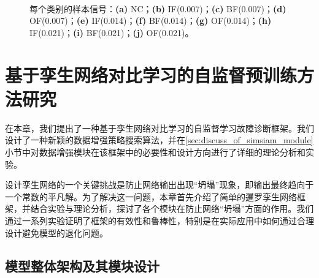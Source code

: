 \documentclass[master]{thesis-uestc}
\begin{document}
\begin{figure}
    \centering
    \\ %
    \\ %
    \\ %

    \caption{每个类别的样本信号：\textbf{(a)} NC；\textbf{(b)} IF(0.007)；\textbf{(c)} BF(0.007)；\textbf{(d)} OF(0.007)；\textbf{(e)} IF(0.014)；\textbf{(f)} BF(0.014)；\textbf{(g)} OF(0.014)；\textbf{(h)} IF(0.021)；\textbf{(i)} BF(0.021)；\textbf{(j)} OF(0.021)。}
    \label{cwru_samples}
\end{figure}



\chapter{基于孪生网络对比学习的自监督预训练方法研究}
在本章，我们提出了一种基于孪生网络对比学习的自监督学习故障诊断框架。我们设计了一种新颖的数据增强策略搜索算法，并在\ref{sec:discuss_of_simsiam_module}小节中对数据增强模块在该框架中的必要性和设计方向进行了详细的理论分析和实验。

设计孪生网络的一个关键挑战是防止网络输出出现“坍塌”现象，即输出最终趋向于一个常数的平凡解。为了解决这一问题，本章首先介绍了简单的暹罗孪生网络框架，并结合实验与理论分析，探讨了各个模块在防止网络“坍塌”方面的作用。我们通过一系列实验证明了框架的有效性和鲁棒性，特别是在实际应用中如何通过合理设计避免模型的退化问题。
\section{模型整体架构及其模块设计}
\end{document}

